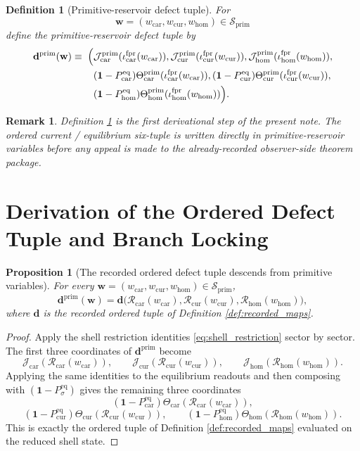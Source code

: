 \documentclass[11pt]{article}
\newcommand{\DefectTuple}{\mathbf d}
\newcommand{\PrimDefectTuple}{\mathbf d^{\mathrm{prim}}}
\newcommand{\PrimShell}{\mathcal S_{\mathrm{prim}}}
\newcommand{\Car}{\mathrm{car}}
\newcommand{\Cur}{\mathrm{cur}}
\newcommand{\Hom}{\mathrm{hom}}
\newcommand{\ForPrimInc}[1]{\iota_{#1}^{\mathrm{fpr}}}
\newcommand{\Reduction}[1]{\mathcal R_{#1}}
\newcommand{\ObsCurrent}[1]{\mathcal J_{#1}}
\newcommand{\ObsTheta}[1]{\Theta_{#1}}
\newcommand{\PrimCurrent}[1]{\mathcal J_{#1}^{\mathrm{prim}}}
\newcommand{\PrimTheta}[1]{\Theta_{#1}^{\mathrm{prim}}}
\newcommand{\EqProj}[1]{P_{#1}^{\mathrm{eq}}}
\newtheorem{definition}{Definition}
\newtheorem{proposition}{Proposition}
\newtheorem{remark}{Remark}
\begin{document}
\begin{definition}[Primitive-reservoir defect tuple]
\label{def:primtuple}
For
\[
\mathbf w=(w_{\Car},w_{\Cur},w_{\Hom})\in\PrimShell
\]
define the \emph{primitive-reservoir defect tuple} by
\begin{equation}
\begin{aligned}
\PrimDefectTuple(\mathbf w)
\equiv\;
\Bigl(
&\PrimCurrent{\Car}(\ForPrimInc{\Car}(w_{\Car})),
\PrimCurrent{\Cur}(\ForPrimInc{\Cur}(w_{\Cur})),
\PrimCurrent{\Hom}(\ForPrimInc{\Hom}(w_{\Hom})),
\\
&(\mathbf 1-\EqProj{\Car})\PrimTheta{\Car}(\ForPrimInc{\Car}(w_{\Car})),
(\mathbf 1-\EqProj{\Cur})\PrimTheta{\Cur}(\ForPrimInc{\Cur}(w_{\Cur})),
\\
&
(\mathbf 1-\EqProj{\Hom})\PrimTheta{\Hom}(\ForPrimInc{\Hom}(w_{\Hom}))
\Bigr).
\end{aligned}
\label{eq:primtuple}
\end{equation}
\end{definition}

\begin{remark}
Definition \ref{def:primtuple} is the first derivational step of the present note. The ordered current / equilibrium six-tuple is written directly in primitive-reservoir variables before any appeal is made to the already-recorded observer-side theorem package.
\end{remark}

\section{Derivation of the Ordered Defect Tuple and Branch Locking}

\begin{proposition}[The recorded ordered defect tuple descends from primitive variables]
\label{prop:descent}
For every \(\mathbf w=(w_{\Car},w_{\Cur},w_{\Hom})\in\PrimShell\),
\begin{equation}
\PrimDefectTuple(\mathbf w)
=
\DefectTuple\bigl(\Reduction{\Car}(w_{\Car}),\Reduction{\Cur}(w_{\Cur}),\Reduction{\Hom}(w_{\Hom})\bigr),
\label{eq:tuple_descent}
\end{equation}
where \(\DefectTuple\) is the recorded ordered tuple of Definition \ref{def:recorded_maps}.
\end{proposition}

\begin{proof}
Apply the shell restriction identities \eqref{eq:shell_restriction} sector by sector. The first three coordinates of \(\PrimDefectTuple\) become
\[
\ObsCurrent{\Car}(\Reduction{\Car}(w_{\Car})),\qquad
\ObsCurrent{\Cur}(\Reduction{\Cur}(w_{\Cur})),\qquad
\ObsCurrent{\Hom}(\Reduction{\Hom}(w_{\Hom})).
\]
Applying the same identities to the equilibrium readouts and then composing with \((\mathbf 1-\EqProj{\sigma})\) gives the remaining three coordinates
\[
(\mathbf 1-\EqProj{\Car})\ObsTheta{\Car}(\Reduction{\Car}(w_{\Car})),
\]
\[
(\mathbf 1-\EqProj{\Cur})\ObsTheta{\Cur}(\Reduction{\Cur}(w_{\Cur})),
\qquad
(\mathbf 1-\EqProj{\Hom})\ObsTheta{\Hom}(\Reduction{\Hom}(w_{\Hom})).
\]
This is exactly the ordered tuple of Definition \ref{def:recorded_maps} evaluated on the reduced shell state.
\end{proof}
\end{document}
